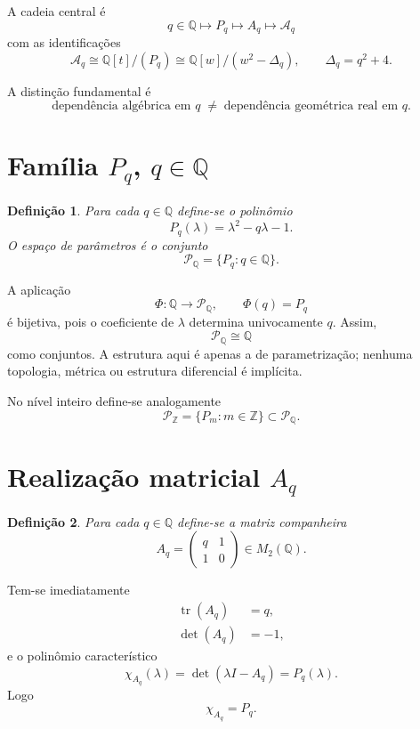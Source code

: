 \documentclass[11pt,a4paper]{article}
\newtheorem{definicao}{Definição}
\begin{document}
A cadeia central é
\[
\boxed{
q\in\mathbb{Q}
\longmapsto
P_q
\longmapsto
A_q
\longmapsto
\mathcal{A}_q
}
\]
com as identificações
\[
\mathcal{A}_q
\cong
\mathbb{Q}[t]/(P_q)
\cong
\mathbb{Q}[w]/(w^2-\Delta_q),
\qquad
\Delta_q=q^2+4.
\]

A distinção fundamental é
\[
\boxed{
\text{dependência algébrica em }q
\;\neq\;
\text{dependência geométrica real em }q.
}
\]

\section{Família \(P_q\), \(q\in\mathbb{Q}\)}

\begin{definicao}
Para cada \(q\in\mathbb{Q}\) define-se o polinômio
\[
P_q(\lambda)=\lambda^2-q\lambda-1.
\]
O espaço de parâmetros é o conjunto
\[
\mathcal{P}_{\mathbb{Q}}
=
\bigl\{P_q:q\in\mathbb{Q}\bigr\}.
\]
\end{definicao}

A aplicação
\[
\Phi:\mathbb{Q}\longrightarrow\mathcal{P}_{\mathbb{Q}},
\qquad
\Phi(q)=P_q
\]
é bijetiva, pois o coeficiente de \(\lambda\) determina univocamente \(q\).
Assim,
\[
\mathcal{P}_{\mathbb{Q}}\cong\mathbb{Q}
\]
como conjuntos. A estrutura aqui é apenas a de parametrização; nenhuma
topologia, métrica ou estrutura diferencial é implícita.

No nível inteiro define-se analogamente
\[
\mathcal{P}_{\mathbb{Z}}=\{P_m:m\in\mathbb{Z}\}\subset\mathcal{P}_{\mathbb{Q}}.
\]

\section{Realização matricial \(A_q\)}

\begin{definicao}
Para cada \(q\in\mathbb{Q}\) define-se a matriz companheira
\[
A_q=\begin{pmatrix}q&1\\1&0\end{pmatrix}\in M_2(\mathbb{Q}).
\]
\end{definicao}

Tem-se imediatamente
\begin{align*}
\operatorname{tr}(A_q)&=q,\\
\det(A_q)&=-1,
\end{align*}
e o polinômio característico
\[
\chi_{A_q}(\lambda)=\det(\lambda I-A_q)=P_q(\lambda).
\]
Logo
\[
\boxed{\chi_{A_q}=P_q.}
\]
\end{document}
